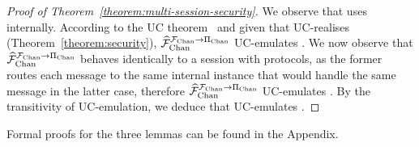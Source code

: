 \begin{proof}[Proof of Theorem~\ref{theorem:multi-session-security}]
  We observe that \fchanhat uses \fchan internally. According to the UC
  theorem~\cite{uc} and given that \pchan UC-realises \fchan
  (Theorem~\ref{theorem:security}), $\widehat{\mathcal{F}}_{\mathrm{Chan}}^{\mathcal{F}_{\mathrm{Chan}} \rightarrow \Pi_{\mathrm{Chan}}}$
  UC-emulates \fchanhat. We now observe that $\widehat{\mathcal{F}}_{\mathrm{Chan}}^{\mathcal{F}_{\mathrm{Chan}} \rightarrow
  \Pi_{\mathrm{Chan}}}$ behaves identically to a session with \pchanhat protocols, as the
  former routes each message to the same internal \pchan instance that would
  handle the same message in the latter case, therefore $\widehat{\mathcal{F}}_{\mathrm{Chan}}^{\mathcal{F}_{\mathrm{Chan}}
  \rightarrow \Pi_{\mathrm{Chan}}}$ UC-emulates \pchanhat. By the transitivity of
  UC-emulation, we deduce that \fchanhat UC-emulates \pchanhat.
\end{proof}

  Formal proofs for the three lemmas can be found in the Appendix.
